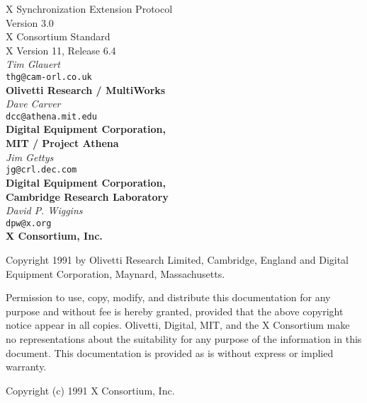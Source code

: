 \begin{center}

{\large X Synchronization Extension Protocol}\\[10pt]
{\large Version 3.0}\\[15pt]
{\large X Consortium Standard}\\[15pt]
{\large X Version 11, Release 6.4}\\[15pt]
{\it Tim Glauert}\\[0pt]
{\tt thg@cam-orl.co.uk}\\[0pt]
{\bf Olivetti Research / MultiWorks}\\[5pt]
{\it Dave Carver}\\[0pt]
{\tt dcc@athena.mit.edu}\\[0pt]
{\bf Digital Equipment Corporation,}\\[0pt]
{\bf MIT / Project Athena}\\[5pt]
{\it Jim Gettys}\\[0pt]
{\tt jg@crl.dec.com}\\[0pt]
{\bf Digital Equipment Corporation,}\\[0pt]
{\bf Cambridge Research Laboratory}\\[5pt]
{\it David P. Wiggins}\\[0pt]
{\tt dpw@x.org}\\[0pt]
{\bf X Consortium, Inc.}\\[0pt]

\end {center}

Copyright 1991 by Olivetti Research Limited, Cambridge, England and
Digital Equipment Corporation, Maynard, Massachusetts.

{\small Permission to use, copy, modify, and distribute this documentation
for any purpose and without fee is hereby granted, provided that the above
copyright notice appear in all copies. Olivetti, Digital, MIT, and the
X Consortium
make no representations about the suitability for any purpose of the
information in this document. This documentation is provided as is without
express or implied warranty.}

Copyright (c) 1991 X Consortium, Inc.

